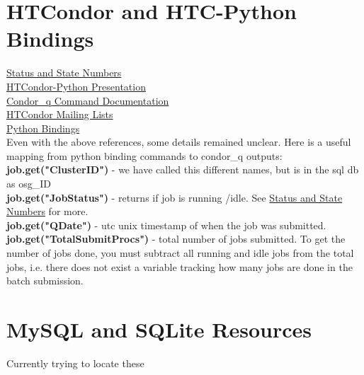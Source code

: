 \section{HTCondor and HTC-Python Bindings}
    \href{http://pages.cs.wisc.edu/~adesmet/status.html}{Status and State Numbers}\\
    \href{https://research.cs.wisc.edu/htcondor/HTCondorWeek2016/presentations/Bockelman_Python-tutorial.pdf}{HTCondor-Python Presentation}\\
    \href{https://research.cs.wisc.edu/htcondor/manual/v8.6/condor_q.html}{Condor\_q Command Documentation}\\
    \href{https://research.cs.wisc.edu/htcondor/mail-lists/}{HTCondor Mailing Lists}\\
    \href{https://htcondor.readthedocs.io/en/latest/apis/python-bindings/index.html}{Python Bindings}\\
    
    Even with the above references, some details remained unclear. Here is a useful mapping from python binding commands to condor\_q outputs:\\
    \newline
    \textbf{job.get("ClusterID")} - we have called this different names, but is in the sql db as osg\_ID\\
    \textbf{job.get("JobStatus")} - returns if job is running /idle. See \href{http://pages.cs.wisc.edu/~adesmet/status.html}{Status and State Numbers} for more.\\
    \textbf{job.get("QDate")} - utc unix timestamp of when the job was submitted.\\
    \textbf{job.get("TotalSubmitProcs")} - total number of jobs submitted. To get the number of jobs done, you must subtract all running and idle jobs from the total jobs, i.e. there does not exist a variable tracking how many jobs are done in the batch submission.\\
    
\section{MySQL and SQLite Resources}
    Currently trying to locate these
    